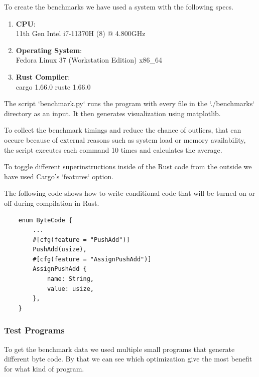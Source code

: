 \documentclass{article}
\begin{document}
To create the benchmarks we have used a system with the following specs.

\begin{enumerate}
    \item \textbf{CPU}:\\
        11th Gen Intel i7-11370H (8) @ 4.800GHz 
    \item \textbf{Operating System}:\\
        Fedora Linux 37 (Workstation Edition) x86\_64 
    \item \textbf{Rust Compiler}:\\
        cargo 1.66.0
        rustc 1.66.0
\end{enumerate}

The script `benchmark.py` runs the program with every file in the
`./benchmarks` directory as an input. It then generates visualization using
matplotlib.

To collect the benchmark timings and reduce the chance of outliers, that can
occure because of external reasons such as system load or memory availability,
the script executes each command 10 times and calculates the average.

To toggle different superinstructions inside of the Rust code from the 
outside we have used Cargo's `features` option.

The following code shows how to write conditional code that will be turned on
or off during compilation in Rust.

\begin{verbatim}
    enum ByteCode {
        ...
        #[cfg(feature = "PushAdd")]
        PushAdd(usize),
        #[cfg(feature = "AssignPushAdd")]
        AssignPushAdd {
            name: String,
            value: usize,
        },
    }
\end{verbatim}

\subsubsection{Test Programs}
To get the benchmark data we used multiple small programs that generate
different byte code. By that we can see which optimization give the most
benefit for what kind of program.
\end{document}

